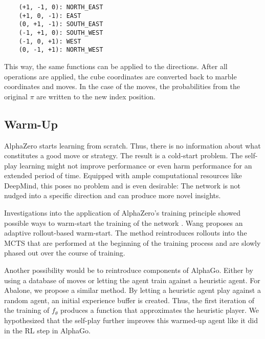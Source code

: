 \begin{BVerbatim}
    (+1, -1, 0): NORTH_EAST
    (+1, 0, -1): EAST
    (0, +1, -1): SOUTH_EAST
    (-1, +1, 0): SOUTH_WEST
    (-1, 0, +1): WEST
    (0, -1, +1): NORTH_WEST
\end{BVerbatim}

This way, the same functions can be applied to the directions. After all operations are applied, the cube coordinates are converted back to marble coordinates and moves. In the case of the moves, the probabilities from the original $\pi$ are written to the new index position.

\subsection{Warm-Up}
AlphaZero starts learning from scratch. Thus, there is no information about what constitutes a good move or strategy. The result is a cold-start problem. The self-play learning might not improve performance or even harm performance for an extended period of time. Equipped with ample computational resources like DeepMind, this poses no problem and is even desirable: The network is not nudged into a specific direction and can produce more novel insights.

Investigations into the application of AlphaZero's training principle showed possible ways to warm-start the training of the network \cite{wang_adaptive_2021}. Wang proposes an adaptive rollout-based warm-start. The method reintroduces rollouts into the MCTS that are performed at the beginning of the training process and are slowly phased out over the course of training.

Another possibility would be to reintroduce components of AlphaGo. Either by using a database of moves or letting the agent train against a heuristic agent. For Abalone, we propose a similar method. By letting a heuristic agent play against a random agent, an initial experience buffer is created. Thus, the first iteration of the training of $f_{\theta}$ produces a function that approximates the heuristic player. We hypothesized that the self-play further improves this warmed-up agent like it did in the RL step in AlphaGo.
